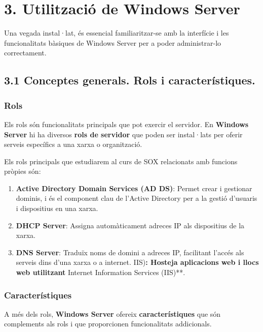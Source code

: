 \documentclass[
  a4paper,
]{article}
\begin{document}
\section{3. Utilització de Windows
Server}\label{utilitzaciuxf3-de-windows-server}

Una vegada instal·lat, és essencial familiaritzar-se amb la interfície i
les funcionalitats bàsiques de Windows Server per a poder administrar-lo
correctament.

\subsection{3.1 Conceptes generals. Rols i
característiques.}\label{conceptes-generals.-rols-i-caracteruxedstiques.}

\subsubsection{Rols}\label{rols}

Els rols són funcionalitats principals que pot exercir el servidor. En
\textbf{Windows Server} hi ha diversos \textbf{rols de servidor} que
poden ser instal·lats per oferir serveis específics a una xarxa o
organització.

Els rols principals que estudiarem al curs de SOX relacionats amb
funcions pròpies són:

\begin{enumerate}
\def\labelenumi{\arabic{enumi}.}
\item
  \textbf{Active Directory Domain Services (AD DS)}: Permet crear i
  gestionar dominis, i és el component clau de l'Active Directory per a
  la gestió d'usuaris i dispositius en una xarxa.
\item
  \textbf{DHCP Server}: Assigna automàticament adreces IP als
  dispositius de la xarxa.
\item
  \textbf{DNS Server}: Traduïx noms de domini a adreces IP, facilitant
  l'accés als serveis dins d'una xarxa o a internet. IIS)\textbf{:
  Hosteja aplicacions web i llocs web utilitzant }Internet Information
  Services (IIS)**.
\end{enumerate}

\subsubsection{Característiques}\label{caracteruxedstiques}

A més dels rols, \textbf{Windows Server} ofereix
\textbf{característiques} que són complements als rols i que
proporcionen funcionalitats addicionals.
\end{document}
